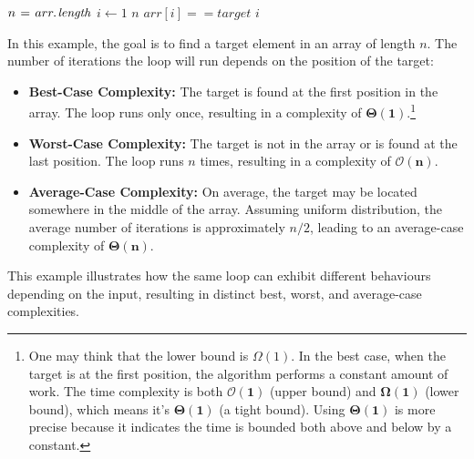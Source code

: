 \begin{example}

    \begin{codebox}
        \li $n \gets \attrib{arr}{length}$
        \li \For $i \gets 1$ \To $n$ \Do
        \li     \If $arr[i] == target$ \Then
        \li         \Return $i$ 
                \End
            \End
    \end{codebox}

    In this example, the goal is to find a target element in an array of length $n$. The number of iterations the loop will run depends on the position of the target:

    \begin{itemize}
        \item \textbf{Best-Case Complexity:} The target is found at the first position in the array. The loop runs only once, resulting in a complexity of $\boldsymbol{\Theta(1)}$.\footnote{One may think that the lower bound is $\Omega(1)$. In the best case, when the target is at the first position, the algorithm performs a constant amount of work. The time complexity is both $\boldsymbol{\mathcal{O}(1)}$ (upper bound) and $\boldsymbol{\Omega(1)}$ (lower bound), which means it's $\boldsymbol{\Theta(1)}$ (a tight bound). Using $\boldsymbol{\Theta(1)}$ is more precise because it indicates the time is bounded both above and below by a constant.}
        \item \textbf{Worst-Case Complexity:} The target is not in the array or is found at the last position. The loop runs $n$ times, resulting in a complexity of $\boldsymbol{\mathcal{O}(n)}$.
        \item \textbf{Average-Case Complexity:} On average, the target may be located somewhere in the middle of the array. Assuming uniform distribution, the average number of iterations is approximately $n/2$, leading to an average-case complexity of $\boldsymbol{\Theta(n)}$.
    \end{itemize}    

    This example illustrates how the same loop can exhibit different behaviours depending on the input, resulting in distinct best, worst, and average-case complexities.
\end{example}

